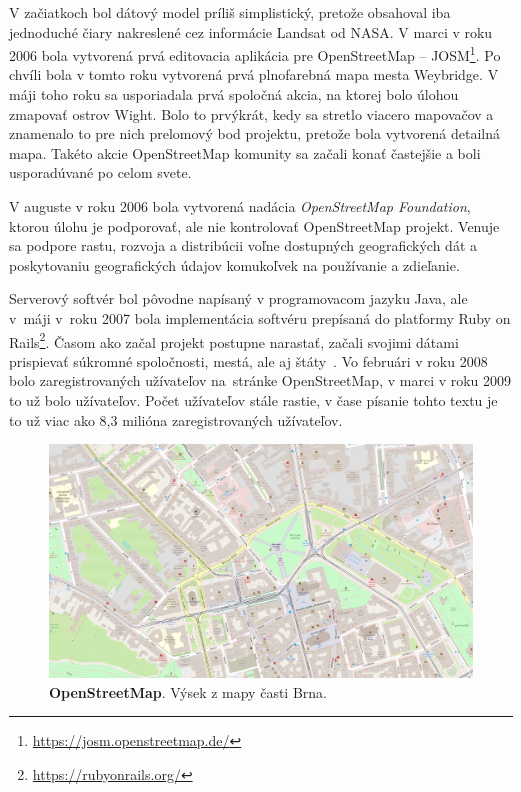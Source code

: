 V začiatkoch bol dátový model príliš simplistický, pretože obsahoval iba jednoduché čiary nakreslené cez informácie Landsat od NASA. V marci v roku 2006 bola vytvorená prvá editovacia aplikácia pre OpenStreetMap \--- JOSM\footnote{\url{https://josm.openstreetmap.de/}}. Po chvíli bola v tomto roku vytvorená prvá plnofarebná mapa mesta Weybridge. V máji toho roku sa usporiadala prvá spoločná akcia, na ktorej bolo úlohou zmapovať ostrov Wight. Bolo to prvýkrát, kedy sa stretlo viacero mapovačov a znamenalo to pre nich prelomový bod projektu, pretože bola vytvorená detailná mapa. Takéto akcie OpenStreetMap komunity sa začali konať častejšie a boli usporadúvané po celom svete.

V auguste v roku 2006 bola vytvorená nadácia \emph{OpenStreetMap Foundation}, ktorou úlohu je podporovať, ale nie kontrolovať OpenStreetMap projekt. Venuje sa podpore rastu, rozvoja a distribúcii voľne dostupných geografických dát a poskytovaniu geografických údajov komukoľvek na používanie a zdieľanie.

Serverový softvér bol pôvodne napísaný v programovacom jazyku Java, ale v~máji v~roku 2007 bola implementácia softvéru prepísaná do platformy Ruby on Rails\footnote{\url{https://rubyonrails.org/}}. Časom ako začal projekt postupne narastať, začali svojimi dátami prispievať súkromné spoločnosti, mestá, ale aj štáty~\cite{bennett2010openstreetmap}. Vo februári v roku 2008 bolo zaregistrovaných  užívateľov na~stránke OpenStreetMap, v marci v roku 2009 to už bolo  užívateľov. Počet užívateľov stále rastie, v čase písanie tohto textu je to už viac ako 8,3 milióna zaregistrovaných užívateľov.

\begin{figure}[ht]
    \centering
    \includegraphics[width=\linewidth]{obrazky-figures/openstreetmap.png}
    \caption{\textbf{OpenStreetMap}. Výsek z mapy časti Brna.}
    \label{fig:openstreetmap}
\end{figure}

